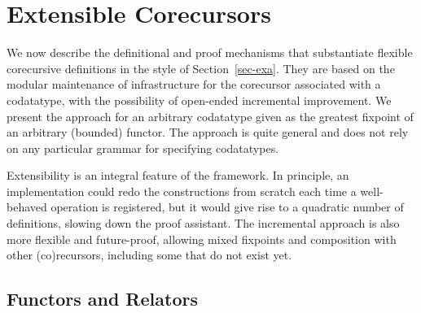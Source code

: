 \documentclass[preprint,draft]
{sigplanconf}
\newcommand{\<}{\langle}
\renewcommand{\>}{\rangle}
\def\S{Section~}
\begin{document}
\section{Extensible Corecursors}
\label{sec-meta}

We now describe the definitional and proof mechanisms that substantiate flexible corecursive definitions
in the style of \S\ref{sec-exa}.  They are based on the modular maintenance of
infrastructure for the corecursor associated with a codatatype, with the possibility of open-ended incremental improvement.
We present the approach for an arbitrary codatatype
given as the greatest fixpoint of an arbitrary (bounded) functor.
The approach is quite general
and does not rely on any particular grammar for specifying codatatypes.

Extensibility is an integral feature of the framework. In principle, an
implementation could redo the constructions from scratch each time a
well-behaved operation is registered, but it would give rise to a quadratic
number of definitions, slowing down the proof assistant. The incremental
approach is also more flexible and future-proof, allowing mixed fixpoints and
composition with other (co)recursors, including some that do not exist yet.



\subsection{Functors and Relators}
\label{sec-funcs-rels}
\end{document}
